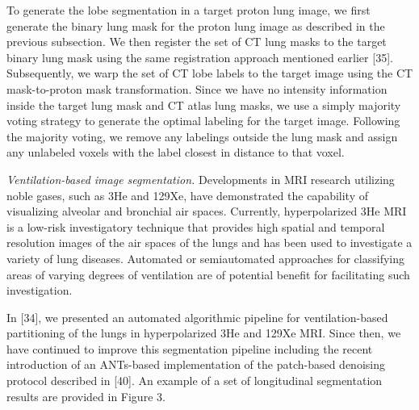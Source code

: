 \documentclass[11pt,]{article}
\begin{document}
To generate the lobe segmentation in a target proton lung image, we
first generate the binary lung mask for the proton lung image as
described in the previous subsection. We then register the set of CT
lung masks to the target binary lung mask using the same registration
approach mentioned earlier {[}35{]}. Subsequently, we warp the set of CT
lobe labels to the target image using the CT mask-to-proton mask
transformation. Since we have no intensity information inside the target
lung mask and CT atlas lung masks, we use a simply majority voting
strategy to generate the optimal labeling for the target image.
Following the majority voting, we remove any labelings outside the lung
mask and assign any unlabeled voxels with the label closest in distance
to that voxel.

\emph{Ventilation-based image segmentation.} Developments in MRI
research utilizing noble gases, such as 3He and 129Xe, have demonstrated
the capability of visualizing alveolar and bronchial air spaces.
Currently, hyperpolarized 3He MRI is a low-risk investigatory technique
that provides high spatial and temporal resolution images of the air
spaces of the lungs and has been used to investigate a variety of lung
diseases. Automated or semiautomated approaches for classifying areas of
varying degrees of ventilation are of potential benefit for facilitating
such investigation.

In {[}34{]}, we presented an automated algorithmic pipeline for
ventilation-based partitioning of the lungs in hyperpolarized 3He and
129Xe MRI. Since then, we have continued to improve this segmentation
pipeline including the recent introduction of an ANTs-based
implementation of the patch-based denoising protocol described in
{[}40{]}. An example of a set of longitudinal segmentation results are
provided in Figure 3.
\end{document}
